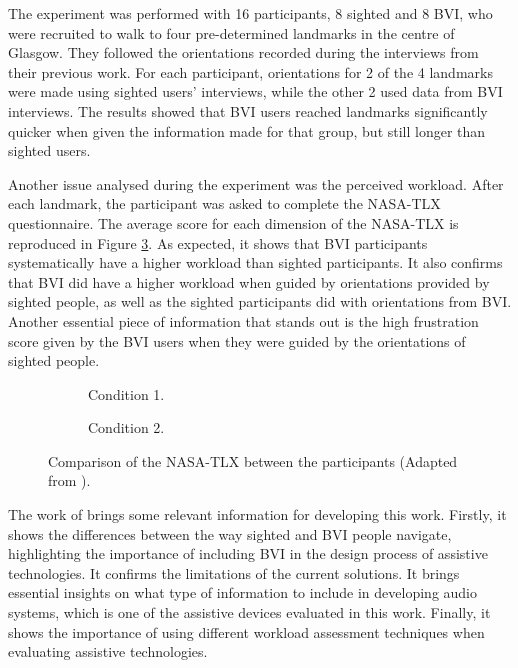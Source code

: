 The experiment was performed with 16 participants, 8 sighted and 8 BVI, who were recruited to walk to four pre-determined landmarks in the centre of Glasgow. They followed the orientations recorded during the interviews from their previous work. For each participant, orientations for 2 of the 4 landmarks were made using sighted users' interviews, while the other 2 used data from BVI interviews. The results showed that BVI users reached landmarks significantly quicker when given the information made for that group, but still longer than sighted users. 

Another issue analysed during the experiment was the perceived workload. After each landmark, the participant was asked to complete the NASA-TLX questionnaire. The average score for each dimension of the NASA-TLX is reproduced in Figure \ref{fig:bradley_2005_participants}. As expected, it shows that BVI participants systematically have a higher workload than sighted participants. It also confirms that BVI did have a higher workload when guided by orientations provided by sighted people, as well as the sighted participants did with orientations from BVI. Another essential piece of information that stands out is the high frustration score given by the BVI users when they were guided by the orientations of sighted people.

\begin{figure}[htbp]
    \centering
    \begin{subfigure}{.49\textwidth}
        \centering
        \resizebox{\linewidth}{!}{
        
        }
        \caption{Condition 1.}
        \label{fig:bradley_2005_nasa_participants_1}
    \end{subfigure}
    \hfill
    \begin{subfigure}{.49\textwidth}
        \centering
        \resizebox{\linewidth}{!}{
        
        }
        \caption{Condition 2.}
        \label{fig:bradley_2005_nasa_participants_2}
    \end{subfigure}
\caption{Comparison of the NASA-TLX between the participants (Adapted from ).}
\label{fig:bradley_2005_participants}
\end{figure}

The work of  brings some relevant information for developing this work. Firstly, it shows the differences between the way sighted and BVI people navigate, highlighting the importance of including BVI in the design process of assistive technologies. It confirms the limitations of the current solutions. It brings essential insights on what type of information to include in developing audio systems, which is one of the assistive devices evaluated in this work. Finally, it shows the importance of using different workload assessment techniques when evaluating assistive technologies.